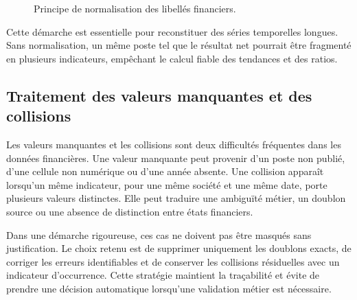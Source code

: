 \begin{figure}[H]
\centering
{}
\caption[Normalisation des libellés financiers]{Principe de normalisation des libellés financiers.}
\label{fig:normalisation}
\end{figure}

\par Cette démarche est essentielle pour reconstituer des séries temporelles
longues. Sans normalisation, un même poste tel que le résultat net pourrait être
fragmenté en plusieurs indicateurs, empêchant le calcul fiable des tendances et
des ratios.

\subsection{Traitement des valeurs manquantes et des collisions}
\par Les valeurs manquantes et les collisions sont deux difficultés fréquentes
dans les données financières. Une valeur manquante peut provenir d'un poste non
publié, d'une cellule non numérique ou d'une année absente. Une collision
apparaît lorsqu'un même indicateur, pour une même société et une même date,
porte plusieurs valeurs distinctes. Elle peut traduire une ambiguïté métier, un
doublon source ou une absence de distinction entre états financiers.

\par Dans une démarche rigoureuse, ces cas ne doivent pas être masqués sans
justification. Le choix retenu est de supprimer uniquement les doublons exacts,
de corriger les erreurs identifiables et de conserver les collisions résiduelles
avec un indicateur d'occurrence. Cette stratégie maintient la traçabilité et
évite de prendre une décision automatique lorsqu'une validation métier est
nécessaire.


